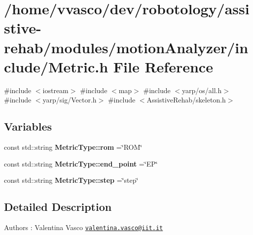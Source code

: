 \section{/home/vvasco/dev/robotology/assistive-\/rehab/modules/motion\+Analyzer/include/\+Metric.h File Reference}
\label{Metric_8h}
{\ttfamily \#include $<$iostream$>$}\newline
{\ttfamily \#include $<$map$>$}\newline
{\ttfamily \#include $<$yarp/os/all.\+h$>$}\newline
{\ttfamily \#include $<$yarp/sig/\+Vector.\+h$>$}\newline
{\ttfamily \#include $<$Assistive\+Rehab/skeleton.\+h$>$}\newline
\subsection*{Variables}
\begin{DoxyCompactItemize}
\item 
\mbox{\label{Metric_8h_a134a0ba35a0bfd473142dcba2fa0ac8f}} 
const std\+::string {\bfseries Metric\+Type\+::rom} =\char`\"{}R\+OM\char`\"{}
\item 
\mbox{\label{Metric_8h_ac4580e78dfaef7eb23d717bd230174e4}} 
const std\+::string {\bfseries Metric\+Type\+::end\+\_\+point} =\char`\"{}EP\char`\"{}
\item 
\mbox{\label{Metric_8h_a72bfe667eedeae0fa4a698a4450413d2}} 
const std\+::string {\bfseries Metric\+Type\+::step} =\char`\"{}step\char`\"{}
\end{DoxyCompactItemize}


\subsection{Detailed Description}
\begin{DoxyAuthor}{Authors}
\+: Valentina Vasco \href{mailto:valentina.vasco@iit.it}{\tt valentina.\+vasco@iit.\+it} 
\end{DoxyAuthor}
